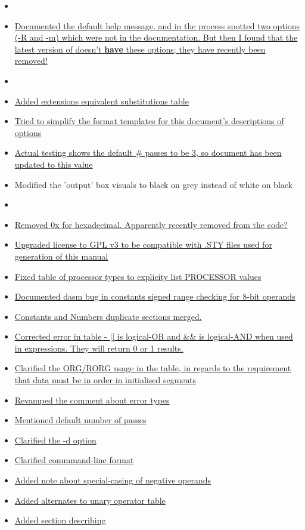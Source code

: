 \begin{itemize}
\item[]
\item \hyperref[changelog:20200831help]{Documented the default \dasm help message, and in the process spotted two options (-R and -m) which were not in the documentation. But then I found that the latest version of \dasm doesn't \textbf{have} these options; they have recently been removed!}
\item[]
\item \hyperref[changelog:20200829substitutions]{Added extensions equivalent substitutions table}
\item \hyperref[changelog:20200829formatdescription]{Tried to simplify the format templates for this document's descriptions of options}
\item \hyperref[changelog:20200824passes]{Actual testing shows the default \# passes to be 3, so document has been updated to this value}
\item Modified the 'output' box visuals to black on grey instead of white on black

\item[]
\item \hyperref[changelog:20200824const]{Removed 0x for hexadecimal. Apparently recently removed from the code?}
\item \hyperref[changelog:20200824license]{Upgraded license to GPL v3 to be compatible with .STY files used for generation of this manual}
\item \hyperref[changelog:20200824processor]{Fixed table of processor types to explicity list PROCESSOR values}
\item \hyperref[changelog:20200824rangebug]{Documented dasm bug in constants signed range checking for 8-bit operands}
\item \hyperref[changelog:20200824const]{Constants and Numbers duplicate sections merged.}
\item \hyperref[changelog:20200824arithmetic]{Corrected error in table - || is logical-OR and \&\& is logical-AND when used in expressions. They will return 0 or 1 results.}
\item \hyperref[changelog:20200824org]{Clarified the ORG/RORG usage in the  table, in regards to the requirement that data must be in order in initialised segments}
\item \hyperref[changelog:20200824error]{Revamped the comment about error types}
\item \hyperref[changelog:20200824passes]{Mentioned default number of passes}
\item \hyperref[changelog:20200824developers]{Clarified the -d option}
\item \hyperref[changelog:20200824sourcefile]{Clarified commmand-line format}
\item \hyperref[changelog:specialcase]{Added note about special-casing of negative operands}
\item \hyperref[changelog:alternateunary]{Added alternates to unary operator table}
\item \hyperref[section:numberformat]{Added section describing }


\end{itemize}
